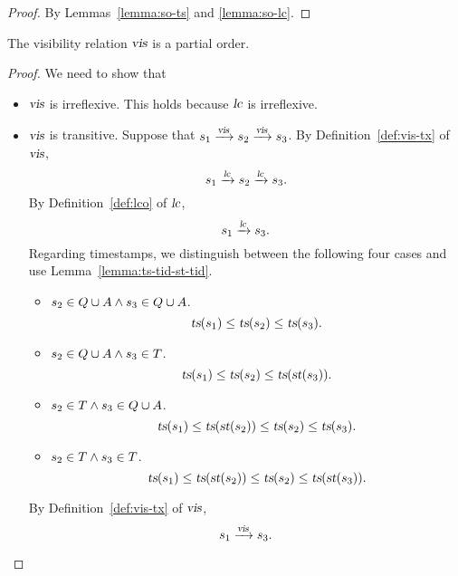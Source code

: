 \begin{proof} \label{proof:so-vis}
  By Lemmas~\ref{lemma:so-ts} and \ref{lemma:so-lc}.
\end{proof}

\begin{applemma} \label{lemma:vis-partial}
  The visibility relation $\textsl{vis}$ is a partial order.
\end{applemma}

\begin{proof} \label{proof:vis-partial}
  We need to show that
  \begin{itemize}
    \item $\textsl{vis}$ is irreflexive.
      This holds because $\textsl{lc}$ is irreflexive.
    \item $\textsl{vis}$ is transitive.
      Suppose that $s_{1} \xrightarrow{\textsl{vis}} s_{2} \xrightarrow{\textsl{vis}} s_{3}$.
      By Definition~\ref{def:vis-tx} of $\textsl{vis}$,
      \[
        s_{1} \xrightarrow{\textsl{lc}} s_{2} \xrightarrow{\textsl{lc}} s_{3}.
      \]
      By Definition~\ref{def:lco} of $\textsl{lc}$,
      \[
        s_{1} \xrightarrow{\textsl{lc}} s_{3}.
      \]
      Regarding timestamps,
      we distinguish between the following four cases
      and use Lemma~\ref{lemma:ts-tid-st-tid}.
      \begin{itemize}
        \item $s_{2} \in Q \cup A
          \land s_{3} \in Q \cup A$.
          \[
            \textsl{ts}(s_{1}) \le \textsl{ts}(s_{2})
              \le \textsl{ts}(s_{3}).
          \]
        \item $s_{2} \in Q \cup A
          \land s_{3} \in T$.
          \[
            \textsl{ts}(s_{1}) \le \textsl{ts}(s_{2})
              \le \textsl{ts}(\textsl{st}(s_{3})).
          \]
        \item $s_{2} \in T \land s_{3} \in Q \cup A$.
          \[
            \textsl{ts}(s_{1}) \le \textsl{ts}(\textsl{st}(s_{2}))
              \le \textsl{ts}(s_{2}) \le \textsl{ts}(s_{3}).
          \]
        \item $s_{2} \in T \land s_{3} \in T$.
          \[
            \textsl{ts}(s_{1}) \le \textsl{ts}(\textsl{st}(s_{2}))
              \le \textsl{ts}(s_{2}) \le \textsl{ts}(\textsl{st}(s_{3})).
          \]
      \end{itemize}
      By Definition~\ref{def:vis-tx} of $\textsl{vis}$,
      \[
        s_{1} \xrightarrow{\textsl{vis}} s_{3}.
      \]
  \end{itemize}
\end{proof}

